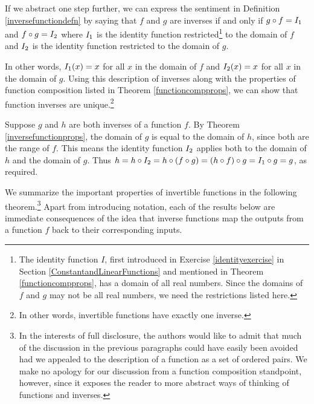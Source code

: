 \smallskip

If we abstract one step further, we can express the sentiment in Definition \ref{inversefunctiondefn} by saying that $f$ and $g$ are inverses if and only if  $g \circ f = I_{\text{\scriptsize $1$}}$ and $f \circ g = I_{\text{\scriptsize $2$}}$ where $I_{\text{\scriptsize $1$}}$ is the identity function restricted\footnote{The identity function $I$, first introduced in Exercise \ref{identityexercise} in Section \ref{ConstantandLinearFunctions} and mentioned in Theorem \ref{functioncompprops}, has a domain of all real numbers.  Since the domains of $f$ and $g$ may not be all real numbers, we need the restrictions listed here.} to the domain of $f$ and $I_{\text{\scriptsize $2$}}$ is the identity function restricted to the domain of $g$.  

\smallskip

In other words, $I_{\text{\scriptsize $1$}}(x) = x$ for all $x$ in the domain of $f$ and $I_{\text{\scriptsize $2$}}(x) = x$ for all $x$ in the domain of $g$.    Using this description of inverses along with the properties of function composition listed in Theorem  \ref{functioncompprops}, we can show that function inverses are unique.\footnote{In other words, invertible functions have exactly one inverse.}   

\smallskip

Suppose $g$ and $h$ are both inverses of a function $f$. By Theorem \ref{inversefunctionprops}, the domain of $g$ is equal to the domain of $h$, since both are the range of $f$.  This means the identity function $I_{\text{\scriptsize $2$}}$ applies both to the domain of $h$ and the domain of $g$.  Thus $h = h \circ I_{\text{\scriptsize $2$}} = h \circ (f \circ g) = (h \circ f) \circ g = I_{\text{\scriptsize $1$}} \circ g = g$, as required.

\smallskip

We summarize the important properties of invertible functions in the following theorem.\footnote{In the interests of full disclosure, the authors would like to admit that much of the discussion in the previous paragraphs could have easily been avoided had we appealed to the description of a function as a set of ordered pairs.  We make no apology for our discussion from a function composition standpoint, however, since it exposes the reader to more abstract ways of thinking of functions and inverses.  }  Apart from introducing notation, each of the results below are immediate consequences of the idea that inverse functions map the outputs from a function $f$  back to their corresponding inputs.


